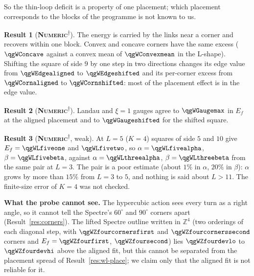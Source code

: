 \documentclass[11pt]{article}
\newcommand{\numeric}{\textbf{\textsc{Numeric}}}
\newcommand{\snap}{\textsuperscript{$\dagger$}}      %
\theoremstyle{definition}
\newtheorem{result}{Result}
\begin{document}
So the thin-loop deficit is a property of one placement; which placement corresponds to the blocks of the programme is not known to us.
\begin{result}[\numeric\snap]\label{res:wl-corner}
The energy is carried by the links near a corner and recovers within one block. Convex and concave corners have the same excess ($\qgWConcave$ against a convex mean of $\qgWConvexmean$ in the L-shape). Shifting the square of side $9$ by one step in two directions changes its edge value from $\qgWEdgealigned$ to $\qgWEdgeshifted$ and its per-corner excess from $\qgWCornaligned$ to $\qgWCornshifted$: most of the placement effect is in the edge value.
\end{result}
\begin{result}[\numeric\snap]\label{res:wl-gauge}
Landau and $\xi=1$ gauges agree to $\qgWGaugemax$ in $E_f$ at the aligned placement and to $\qgWGaugeshifted$ for the shifted square.
\end{result}
\begin{result}[\numeric\snap, weak]\label{res:wl-L}
At $L=5$ ($K=4$) squares of side $5$ and $10$ give $E_f=\qgWLfiveone$ and $\qgWLfivetwo$, so $\alpha=\qgWLfivealpha$, $\beta=\qgWLfivebeta$, against $\alpha=\qgWLthreealpha$, $\beta=\qgWLthreebeta$ from the same pair at $L=3$. The pair is a poor estimate (about $1\%$ in $\alpha$, $20\%$ in $\beta$): $\alpha$ grows by more than $15\%$ from $L=3$ to $5$, and nothing is said about $L>11$. The finite-size error of $K=4$ was not checked.
\end{result}
\textbf{What the probe cannot see.}\label{sec:probe-limits} The hypercubic action sees every turn as a right angle, so it cannot tell the Spectre's $60^\circ$ and $90^\circ$ corners apart (Result~\ref{res:corners}). The lifted Spectre outline written in $\mathbb{Z}^4$ (two orderings of each diagonal step, with $\qgWZfourcornersfirst$ and $\qgWZfourcornerssecond$ corners and $E_f=\qgWZfourfirst$, $\qgWZfoursecond$) lies $\qgWZfourdevlo$ to $\qgWZfourdevhi$ above the aligned fit, but this cannot be separated from the placement spread of Result~\ref{res:wl-place}; we claim only that the aligned fit is not reliable for it.


\end{document}
